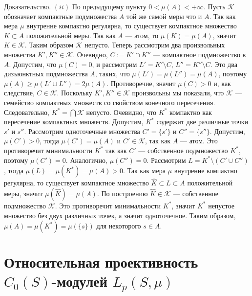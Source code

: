 \documentclass[12pt]{article}
\numberwithin{equation}{subsection}
\theoremstyle{plain}
\newenvironment{proof}{Доказательство.}{}
\begin{document}
\begin{fulltext}
\begin{proof}
        $(ii)$ По предыдущему пункту $0<\mu(A)<+\infty$. Пусть $\mathcal{K}$
        обозначает компактные подмножества $A$ той же самой меры что и $A$. Так
        как мера $\mu$ внутренне компактно регулярна, то существует компактное
        множество $K\subset A$ положительной меры. Так как $A$ --- атом, то
        $\mu(K)=\mu(A)$, значит $K\in\mathcal{K}$. Таким образом $\mathcal{K}$
        непусто. Теперь рассмотрим два произвольных множества
        $K',K''\in\mathcal{K}$. Очевидно, $C:=K'\cap K''$ --- компактное
        подмножество в $A$. Допустим, что $\mu(C)=0$, и рассмотрим
        $L'=K'\setminus C$, $L''=K''\setminus C$. Это два дизъюнктных
        подмножества $A$, таких, что $\mu(L')=\mu(L'')=\mu(A)$, поэтому
        $\mu(A)\geq \mu(L'\cup L'')=2\mu(A)$. Противоречие, значит $\mu(C)>0$ и,
        как следствие, $C\in\mathcal{K}$. Поскольку $K', K''\in \mathcal{K}$
        произвольны мы показали, что $\mathcal{K}$ --- семейство компактных
        множеств со свойством конечного пересечения. Следовательно,
        $K^*=\bigcap\mathcal{K}$ непусто. Очевидно, что $K^*$ компактно как
        пересечение компактных множеств. Допустим, $K^*$ содержит две различные
        точки $s'$ и $s''$. Рассмотрим одноточечные множества $C'=\{s'\}$ и
        $C''=\{s''\}$. Допустим, $\mu(C')>0$, тогда $\mu(C')=\mu(A)$ и
        $C'\in\mathcal{K}$, так как $A$ --- атом. Это противоречит минимальности
        $K^*$ так как $C'$ --- собственное подмножество $K^*$, поэтому
        $\mu(C')=0$. Аналогично, $\mu(C'')=0$. Рассмотрим $L=K^*\setminus
            (C'\cup C'')$, тогда $\mu(L)=\mu(K^*)=\mu(A)>0$. Так как мера $\mu$
        внутренне компактно регулярна, то существует компактное множество
        $\hat{K}\subset L\subset A$ положительной меры, значит
        $\mu(\hat{K})=\mu(A)$. По построению $\hat{K}\in\mathcal{K}$ ---
        собственное подмножество $\mathcal{K}$. Это противоречит минимальности
        $K^*$, значит $K^*$ непустое множество без двух различных точек, а
        значит одноточечное. Таким образом, $\mu(A)=\mu(K^*)=\mu(\{s\})$ для
        некоторого $s\in A$.
    \end{proof}


    \section{Относительная проективность $C_0(S)$-модулей
      $L_p(S,\mu)$}\label{SectionRelativeProjectivityOfC0SModulesLpSmu}


\end{fulltext}
\end{document}
